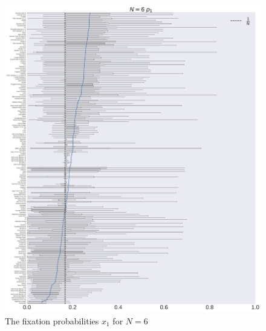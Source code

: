\documentclass[10pt,letterpaper]{article}
\begin{document}
\begin{figure}[!hbtp]
    \centering
    \includegraphics[width=\textwidth]{./boxplot_6_invade.pdf}
    \caption{The fixation probabilities \(x_1\) for \(N=6\)}
\end{figure}
\end{document}
